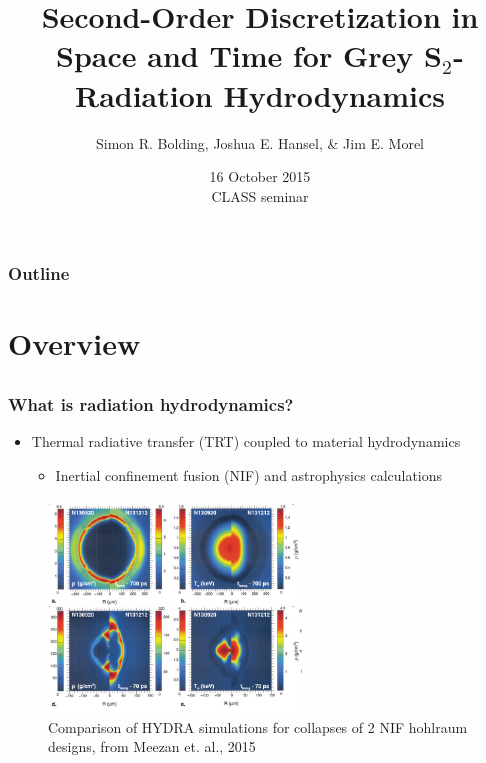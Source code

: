 \documentclass[xcolor=dvipsnames,fontsize=8pt]{beamer}
\title{Second-Order Discretization in Space and Time for Grey S$_2$-Radiation Hydrodynamics}
\author{{\large Simon R. Bolding, Joshua E. Hansel, \& Jim E. Morel}}
\date{16 October 2015 \\ \vspace{0.05in} {CLASS seminar}}
\newlength{\wideitemsep}
\let\olditem\item
\renewcommand{\item}{\setlength{\itemsep}{\wideitemsep}\olditem}
\begin{document}
\begin{frame}
    \titlepage \vspace{-0.213in}
    \begin{center}
    \end{center}    
\end{frame}

\setlength{\tabcolsep}{6pt}

\begin{frame}
\frametitle{Outline}
\begin{minipage}{0.061\linewidth}
\hfill                      
\end{minipage}
\begin{minipage}{0.8\linewidth}
\tableofcontents[
hideothersubsections,
sectionstyle=show,
subsectionstyle=hide
]
\end{minipage}

\end{frame}


\section{Overview}
\subsection{}

\begin{frame}
    \frametitle{What is radiation hydrodynamics?}
    \begin{itemize}
        \item Thermal radiative transfer (TRT) coupled to material hydrodynamics
            \begin{itemize}
                \item Inertial confinement fusion (NIF) and astrophysics calculations
            \end{itemize}
    \end{itemize}
    \begin{figure}
    \includegraphics[width=0.6\textwidth,trim=0.1in 0.1in 0.0in 0.1in,clip]{nif.pdf}
    \caption{Comparison of HYDRA simulations for collapses of 2 NIF hohlraum designs, from Meezan et.
    al., 2015}
    \end{figure}
\end{frame}
\end{document}
